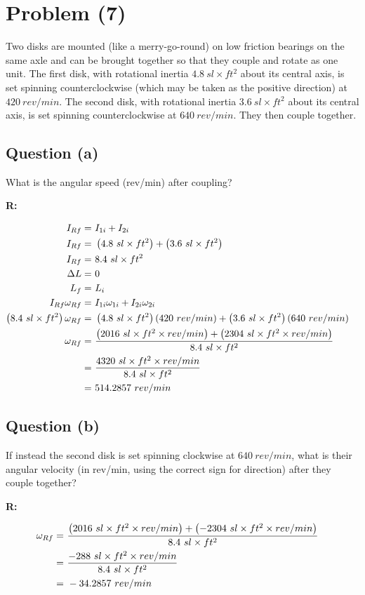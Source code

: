 \section{Problem (7)}
	Two disks are mounted (like a merry-go-round) on low friction bearings on the same axle and can be brought together so that they couple and rotate as one unit. The first disk, with rotational inertia $4.8 \ sl \times ft^{2}$ about its central axis, is set spinning counterclockwise (which may be taken as the positive direction) at $420 \ rev/min$. The second disk, with rotational inertia $3.6 \ sl \times ft^{2}$ about its central axis, is set spinning counterclockwise at $640 \ rev/min$. They then couple together.

	\subsection{Question (a)}

		What is the angular speed (rev/min) after coupling?

		\textbf{R:}

		\begin{align}
			I_{Rf} = \ &I_{1i} + I_{2i}& \notag \\
			I_{Rf} = \ &\left(4.8 \ sl \times ft^{2}\right) + \left(3.6 \ sl \times ft^{2}\right)& \notag \\
			I_{Rf} = \ &8.4 \ sl \times ft^{2}& \notag \\
			\Delta L = \ &0& \notag \\
			L_{f} = \ &L_{i}& \notag \\
			I_{Rf}\omega_{Rf} = \ &I_{1i}\omega_{1i} + I_{2i}\omega_{2i}& \notag \\
			\left(8.4 \ sl \times ft^{2}\right)\omega_{Rf} = \ &\left(4.8 \ sl \times ft^{2}\right)(420 \ rev/min) + \left(3.6 \ sl \times ft^{2}\right)(640 \ rev/min)& \notag \\
			\omega_{Rf} = \ &\frac{\left(2016 \ sl \times ft^{2} \times rev/min\right) + \left(2304 \ sl \times ft^{2} \times rev/min\right)}{8.4 \ sl \times ft^{2}}& \notag \\
			= \ &\frac{4320 \ sl \times ft^{2} \times rev/min}{8.4 \ sl \times ft^{2}}& \notag \\
			= \ &514.2857 \ rev/min&
		\end{align}

	\subsection{Question (b)}

		If instead the second disk is set spinning clockwise at $640 \ rev/min$, what is their angular velocity (in rev/min, using the correct sign for direction) after they couple together?

		\textbf{R:}

		\begin{align}
			\omega_{Rf} = \ &\frac{\left(2016 \ sl \times ft^{2} \times rev/min\right) + \left(-2304 \ sl \times ft^{2} \times rev/min\right)}{8.4 \ sl \times ft^{2}}& \notag \\
			= \ &\frac{-288 \ sl \times ft^{2} \times rev/min}{8.4 \ sl \times ft^{2}}& \notag \\
			= \ &-34.2857 \ rev/min&
		\end{align}
